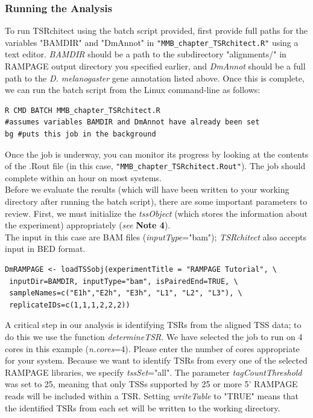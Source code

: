 \documentclass[runningheads,a4paper]{llncs}
\begin{document}
\begin{linenumbers}
\subsubsection{Running the Analysis}
To run TSRchitect using the batch script provided, first provide full paths for the variables "BAMDIR" and "DmAnnot" in \texttt{"MMB\_chapter\_TSRchitect.R"} using a text editor. 
\textit{BAMDIR} should be a path to the subdirectory "alignments/" in RAMPAGE output directory you specified earlier, and \textit{DmAnnot} should be a full path to the \textit{D. melanogaster} gene annotation listed above.
Once this is complete, we can run the batch script from the Linux command-line as follows:

\noindent
\begin{verbatim}
R CMD BATCH MMB_chapter_TSRchitect.R
#assumes variables BAMDIR and DmAnnot have already been set
bg #puts this job in the background
\end{verbatim}

Once the job is underway, you can monitor its progress by looking at the contents of the .Rout file (in this case, \texttt{"MMB\_chapter\_TSRchitect.Rout"}). 
The job should complete within an hour on most systems.\\

Before we evaluate the results (which will have been written to your working directory after running the batch script), there are some important parameters to review. 
First, we must initialize the \textit{tssObject} (which stores the information about the experiment) appropriately (\textit{see} \textbf{Note 4}).\\

The input in this case are BAM files (\textit{inputType}="bam"); \textit{TSRchitect} also accepts input in BED format.

\noindent
\begin{verbatim}
DmRAMPAGE <- loadTSSobj(experimentTitle = "RAMPAGE Tutorial", \
 inputDir=BAMDIR, inputType="bam", isPairedEnd=TRUE, \
 sampleNames=c("E1h","E2h", "E3h", "L1", "L2", "L3"), \
 replicateIDs=c(1,1,1,2,2,2))
\end{verbatim}

A critical step in our analysis is identifying TSRs from the aligned TSS data; to do this we use the function \textit{determineTSR}. 
We have selected the job to run on 4 cores in this example (\textit{n.cores}=4). 
Please enter the number of cores appropriate for your system.
Because we want to identify TSRs from every one of the selected RAMPAGE libraries, we specify \textit{tssSet}="all".
The parameter \textit{tagCountThreshold} was set to 25, meaning that only TSSs supported by 25 or more 5' RAMPAGE reads will be included within a TSR.
Setting \textit{writeTable} to "TRUE" means that the identified TSRs from each set will be written to the working directory. 


\end{linenumbers}
\end{document}
